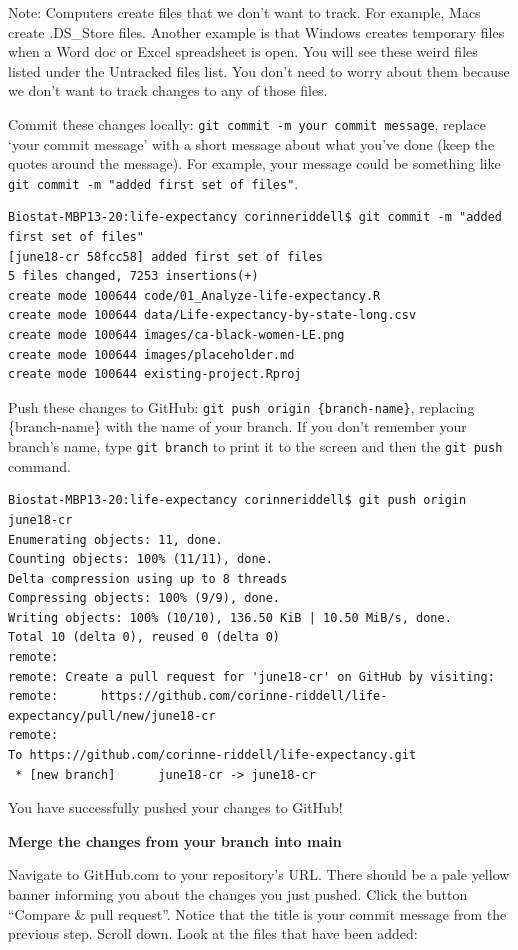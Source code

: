 \documentclass[
]{book}
\begin{document}
Note: Computers create files that we don't want to track. For example, Macs create
.DS\_Store files. Another example is that Windows creates temporary files when a Word
doc or Excel spreadsheet is open. You will see these weird files listed under the
Untracked files list. You don't need to worry about them because we don't want
to track changes to any of those files.

Commit these changes locally: \texttt{git\ commit\ -m\ \textquotesingle{}your\ commit\ message\textquotesingle{}}, replace
`your commit message' with a short message about what you've done (keep the
quotes around the message). For example, your message could be something like
\texttt{git\ commit\ -m\ "added\ first\ set\ of\ files"}.

\begin{verbatim}
Biostat-MBP13-20:life-expectancy corinneriddell$ git commit -m "added first set of files"
[june18-cr 58fcc58] added first set of files
5 files changed, 7253 insertions(+)
create mode 100644 code/01_Analyze-life-expectancy.R
create mode 100644 data/Life-expectancy-by-state-long.csv
create mode 100644 images/ca-black-women-LE.png
create mode 100644 images/placeholder.md
create mode 100644 existing-project.Rproj
\end{verbatim}

Push these changes to GitHub: \texttt{git\ push\ origin\ \{branch-name\}}, replacing
\{branch-name\} with the name of your branch. If you don't remember your branch's
name, type \texttt{git\ branch} to print it to the screen and then the \texttt{git\ push} command.

\begin{verbatim}
Biostat-MBP13-20:life-expectancy corinneriddell$ git push origin june18-cr
Enumerating objects: 11, done.
Counting objects: 100% (11/11), done.
Delta compression using up to 8 threads
Compressing objects: 100% (9/9), done.
Writing objects: 100% (10/10), 136.50 KiB | 10.50 MiB/s, done.
Total 10 (delta 0), reused 0 (delta 0)
remote: 
remote: Create a pull request for 'june18-cr' on GitHub by visiting:
remote:      https://github.com/corinne-riddell/life-expectancy/pull/new/june18-cr
remote: 
To https://github.com/corinne-riddell/life-expectancy.git
 * [new branch]      june18-cr -> june18-cr
\end{verbatim}

You have successfully pushed your changes to GitHub!

\textbf{Merge the changes from your branch into main}

Navigate to GitHub.com to your repository's URL. There should be a pale yellow
banner informing you about the changes you just pushed. Click the button
``Compare \& pull request''. Notice that the title is your commit message from the
previous step. Scroll down. Look at the files that have been added:
\end{document}

